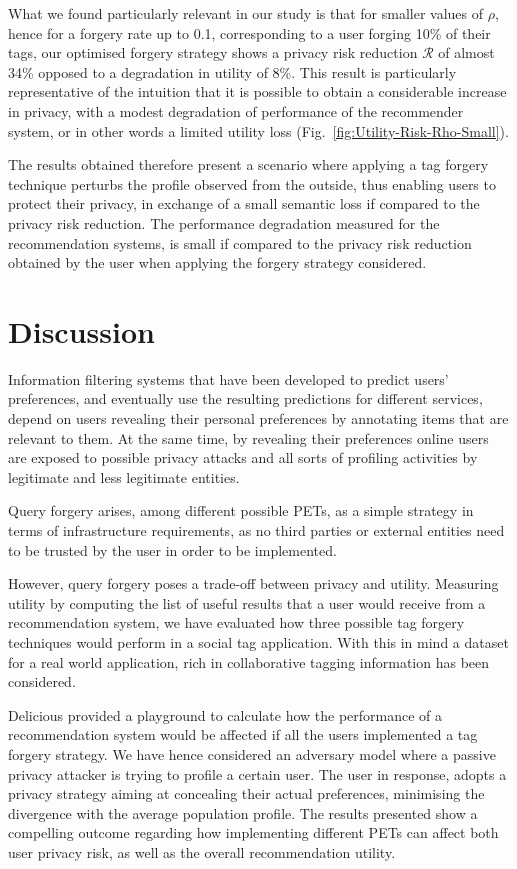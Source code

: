 What we found particularly relevant in our study is that for smaller values of $\rho$, hence for a forgery rate up to 0.1, corresponding to a user forging 10\% of their tags, our optimised forgery strategy shows a privacy risk reduction $\mathcal{R}$  of almost 34\% opposed to a degradation in utility of 8\%. This result is particularly representative of the intuition that it is possible to obtain a considerable increase in privacy, with a modest degradation of performance of the recommender system, or in other words a limited utility loss (Fig.~\ref{fig:Utility-Risk-Rho-Small}).

The results obtained therefore present a scenario where applying a tag forgery technique perturbs the profile observed from the outside, thus enabling users to protect their privacy, in exchange of a small semantic loss if compared to the privacy risk reduction. The performance degradation measured for the recommendation systems, is small if compared to the privacy risk reduction obtained by the user when applying the forgery strategy considered.

\section{Discussion}
\label{sec:discussion}
\noindent
Information filtering systems that have been developed to predict users' preferences, and eventually use the resulting predictions for different services, depend on users revealing their personal preferences by annotating items that are relevant to them.  At the same time, by revealing their preferences online users are exposed to possible privacy attacks and all sorts of profiling activities by legitimate and less legitimate entities.

Query forgery arises, among different possible PETs, as a simple strategy in terms of infrastructure requirements, as no third parties or external entities need to be trusted by the user in order to be implemented.

However, query forgery poses a trade-off between privacy and utility. Measuring utility by computing the list of useful results that a user would receive from a recommendation system, we have evaluated how three possible tag forgery techniques would perform in a social tag application. With this in mind a dataset for a real world application, rich in collaborative tagging information has been considered.

Delicious provided a playground to calculate how the performance of a recommendation system would be affected if all the users implemented a tag forgery strategy. We have hence considered an adversary model where a passive privacy attacker is trying to profile a certain user. The user in response, adopts a privacy strategy aiming at concealing their actual preferences, minimising the divergence with the average population profile. The results presented show a compelling outcome regarding how implementing different PETs can affect both user privacy risk, as well as the overall recommendation utility.

